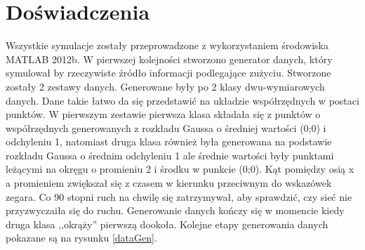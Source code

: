 \documentclass[10pt,a4paper]{article}
\begin{document}
\section{Doświadczenia}
Wszystkie symulacje zostały przeprowadzone z wykorzystaniem środowiska MATLAB 2012b. W pierwszej kolejności stworzono generator danych, który symulował by rzeczywiste źródło informacji podlegające zużyciu. Stworzone zostały 2 zestawy danych. Generowane były po 2 klasy dwu-wymiarowych danych. Dane takie łatwo da się przedstawić na układzie współrzędnych w postaci punktów. W pierwszym zestawie pierwsza klasa składała się z punktów o współrzędnych generowanych z rozkładu Gaussa o średniej wartości (0;0) i odchyleniu 1, natomiast druga klasa również była generowana na podstawie rozkładu Gaussa o średnim odchyleniu 1 ale średnie wartości były punktami leżącymi na okręgu o promieniu 2 i środku w punkcie (0;0). Kąt pomiędzy osią x a promieniem zwiększał się z czasem w kierunku przeciwnym do wskazówek zegara. Co 90 stopni ruch na chwilę się zatrzymywał, aby sprawdzić, czy sieć nie przyzwyczaiła się do ruchu. Generowanie danych kończy się w momencie kiedy druga klasa ,,okrąży'' pierwszą dookoła. Kolejne etapy generowania danych pokazane są na rysunku \ref{dataGen}. 
\end{document}
